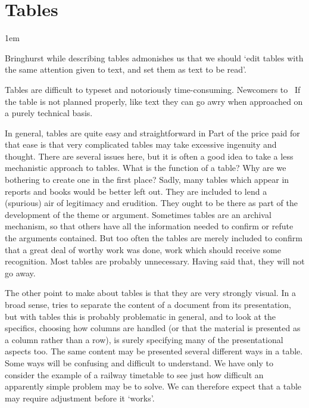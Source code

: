 \chapter{Tables}
\begin{multicols}{2}
\parindent1em

Bringhurst \cite{Bringhurst2005} while describing tables admonishes us that we should  `edit tables with the same attention given to text, and set them as text to be read'.

Tables are difficult to typeset and notoriously time-consuming. Newcomers to \latex\
If the table is not planned properly, like text they can go awry when approached on a
purely technical basis.

In general, tables are quite easy and straightforward in \latex 
Part of the price paid for that ease is that very complicated
tables may take excessive ingenuity and thought. There
are several issues here, but it is often a good idea to take a less
mechanistic approach to tables. What is the function of a table?
Why are we bothering to create one in the first place?
Sadly, many tables which appear in reports and books would
be better left out. They are included to lend a (spurious) air
of legitimacy and erudition. They ought to be there as part
of the development of the theme or argument. Sometimes
tables are an archival mechanism, so that others have all the
information needed to confirm or refute the arguments contained.
But too often the tables are merely included to confirm
that a great deal of worthy work was done, work which
should receive some recognition. Most tables are probably
unnecessary. Having said that, they will not go away.

The other point to make about tables is that they are very
strongly visual. In a broad sense, \latex tries to separate the
content of a document from its presentation, but with tables
this is probably problematic in general, and to look at the
specifics, choosing how columns are handled (or that the material
is presented as a column rather than a row), is surely
specifying many of the presentational aspects too. The same
content may be presented several different ways in a table.
Some ways will be confusing and difficult to understand. We
have only to consider the example of a railway timetable to
see just how difficult an apparently simple problem may be
to solve. We can therefore expect that a table may require
adjustment before it ‘works’.


\end{multicols}
